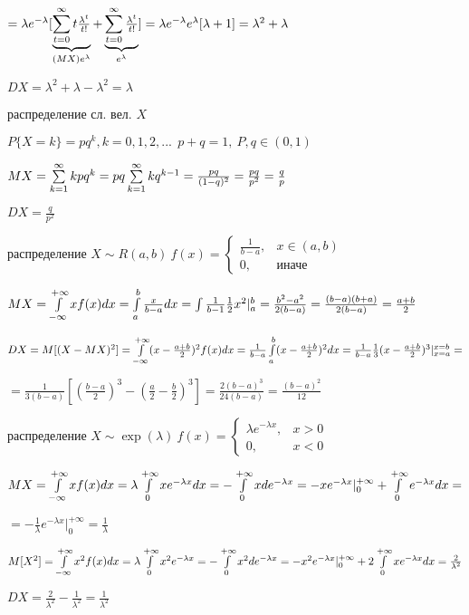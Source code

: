 $=\lambda e^{-\lambda}[\underbrace{\sum\limits_{t=0}^{\infty}t\tfrac{\lambda^t}{t!}}_{(MX)e^{\lambda}}+\underbrace{\sum\limits_{t=0}^{\infty}\tfrac{\lambda^t}{t!}}_{e^\lambda}]=\lambda e^{-\lambda}e^\lambda[\lambda+1]=\lambda^2+\lambda$

$DX=\lambda^2+\lambda-\lambda^2=\lambda$

 распределение сл. вел. $X$

$P\{X=k\}=pq^k, k=0,1,2,...~~p+q=1,~P,q\in(0,1)$

$MX=\sum\limits_{k=1}^{\infty}kpq^k=pq\sum\limits_{k=1}^{\infty}kq^{k-1}=\tfrac{pq}{(1-q)^2}=\tfrac{pq}{p^2}=\tfrac{q}{p}$

$DX=\tfrac{q}{p^2}$

\clearpage

 распределение $X\sim R(a,b)~f(x)=\begin{cases}
	\tfrac{1}{b-a}, & x\in(a,b)\\
	0, & \text{иначе}
\end{cases}$

$MX=\int\limits_{-\infty}^{+\infty}xf(x)dx=\int\limits_{a}^{b}\tfrac{x}{b-a}dx=\int\tfrac{1}{b-1}\tfrac{1}{2}x^2|^b_a=\tfrac{b^2-a^2}{2(b-a)}=\tfrac{(b-a)(b+a)}{2(b-a)}=\tfrac{a+b}{2}$

$DX=M[(X-MX)^2]=\int\limits_{-\infty}^{+\infty}(x-\tfrac{a+b}{2})^2f(x)dx=\tfrac{1}{b-a}\int\limits_{a}^{b}(x-\tfrac{a+b}{2})^2dx=\tfrac{1}{b-a}\tfrac{1}{3}(x-\tfrac{a+b}{2})^3|^{x=b}_{x=a}=$

$=\tfrac{1}{3(b-a)}[(\tfrac{b-a}{2})^3-(\tfrac{a}{2}-\tfrac{b}{2})^3]=\tfrac{2(b-a)^3}{24(b-a)}=\tfrac{(b-a)^2}{12}$

 распределение $X\sim \exp(\lambda)~f(x)=\begin{cases}
	\lambda e^{-\lambda x}, & x>0 \\
	0, & x < 0
\end{cases}$

$MX=\int\limits_{-\infty}^{+\infty}xf(x)dx=\lambda\int\limits_{0}^{+\infty}xe^{-\lambda x}dx=-\int\limits_{0}^{+\infty}xde^{-\lambda x}=-xe^{-\lambda x}|^{+\infty}_0+\int\limits_{0}^{+\infty}e^{-\lambda x}dx=$

$=-\tfrac{1}{\lambda}e^{-\lambda x}|^{+\infty}_0=\tfrac{1}{\lambda}$

$M[X^2]=\int\limits_{-\infty}^{+\infty}x^2f(x)dx=\lambda\int\limits_{0}^{+\infty}x^2e^{-\lambda x}=-\int\limits_{0}^{+\infty}x^2de^{-\lambda x}=-x^2e^{-\lambda x}|^{+\infty}_0+2\int\limits^{+\infty}_0xe^{-\lambda x}dx=\tfrac{2}{\lambda^2}$

$DX=\tfrac{2}{\lambda^2}-\tfrac{1}{\lambda^2}=\tfrac{1}{\lambda^2}$

